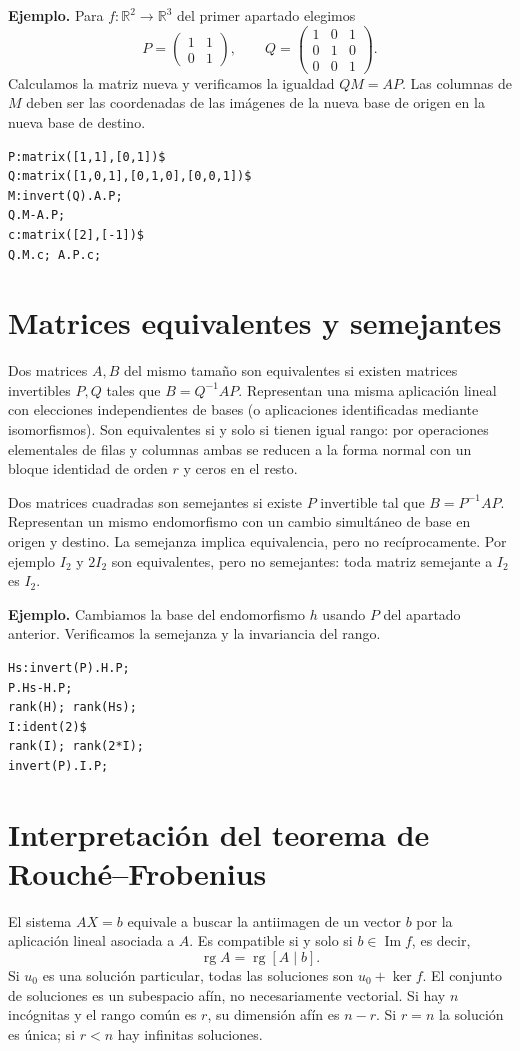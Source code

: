 \documentclass[12pt,a4paper]{article}
\begin{document}
\textbf{Ejemplo.} Para $f:\mathbb R^2\to\mathbb R^3$ del primer apartado elegimos
\[P=\begin{pmatrix}1&1\\0&1\end{pmatrix},\qquad Q=\begin{pmatrix}1&0&1\\0&1&0\\0&0&1\end{pmatrix}.\]
Calculamos la matriz nueva y verificamos la igualdad $QM=AP$. Las columnas de $M$ deben ser las coordenadas de las imágenes de la nueva base de origen en la nueva base de destino.
\begin{lstlisting}
P:matrix([1,1],[0,1])$
Q:matrix([1,0,1],[0,1,0],[0,0,1])$
M:invert(Q).A.P;
Q.M-A.P;
c:matrix([2],[-1])$
Q.M.c; A.P.c;
\end{lstlisting}
\section{Matrices equivalentes y semejantes}
Dos matrices $A,B$ del mismo tamaño son equivalentes si existen matrices invertibles $P,Q$ tales que $B=Q^{-1}AP$. Representan una misma aplicación lineal con elecciones independientes de bases (o aplicaciones identificadas mediante isomorfismos). Son equivalentes si y solo si tienen igual rango: por operaciones elementales de filas y columnas ambas se reducen a la forma normal con un bloque identidad de orden $r$ y ceros en el resto.

Dos matrices cuadradas son semejantes si existe $P$ invertible tal que $B=P^{-1}AP$. Representan un mismo endomorfismo con un cambio simultáneo de base en origen y destino. La semejanza implica equivalencia, pero no recíprocamente. Por ejemplo $I_2$ y $2I_2$ son equivalentes, pero no semejantes: toda matriz semejante a $I_2$ es $I_2$.

\textbf{Ejemplo.} Cambiamos la base del endomorfismo $h$ usando $P$ del apartado anterior. Verificamos la semejanza y la invariancia del rango.
\begin{lstlisting}
Hs:invert(P).H.P;
P.Hs-H.P;
rank(H); rank(Hs);
I:ident(2)$
rank(I); rank(2*I);
invert(P).I.P;
\end{lstlisting}
\section{Interpretación del teorema de Rouché--Frobenius}
El sistema $AX=b$ equivale a buscar la antiimagen de un vector $b$ por la aplicación lineal asociada a $A$. Es compatible si y solo si $b\in\operatorname{Im}f$, es decir,
\[\boxed{\operatorname{rg}A=\operatorname{rg}[A\mid b].}\]
Si $u_0$ es una solución particular, todas las soluciones son $u_0+\ker f$. El conjunto de soluciones es un subespacio afín, no necesariamente vectorial. Si hay $n$ incógnitas y el rango común es $r$, su dimensión afín es $n-r$. Si $r=n$ la solución es única; si $r<n$ hay infinitas soluciones.
\end{document}
